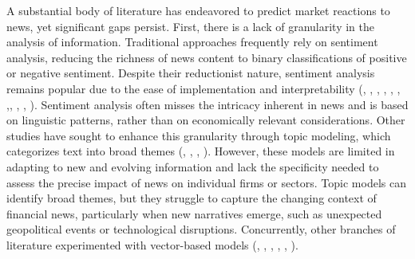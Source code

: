 A substantial body of literature has endeavored to predict market reactions to news, yet significant gaps persist. 
First, there is a lack of granularity in the analysis of information. Traditional approaches frequently rely on sentiment analysis, reducing the richness of news content to binary classifications of positive or negative sentiment. Despite their reductionist nature, sentiment analysis remains popular due to the ease of implementation and interpretability
(\cite{tetlock2007giving}, \cite{tetlock2008more}, \cite{bollen2011twitter}, \cite{hanley2010information}, \cite{loughran2011liability}, \cite{garcia2013sentiment}, \cite{jegadeesh2013word},\cite{wei2018stock}, \cite{ke2019predicting}, \cite{lee2020bert}, 
\cite{lopez2023can}).
Sentiment analysis often misses the intricacy inherent in news and is based on linguistic patterns, rather than on economically relevant considerations.
 Other studies have sought to enhance this granularity through topic modeling, which categorizes text into broad themes 
(\cite{antweiler2006us}, \cite{hansen2018transparency}, \cite{bybee2021business}, \cite{bybee2023narrative}).
However, these models are limited in adapting to new and evolving information and lack the specificity needed to assess the precise impact of news on individual firms or sectors. Topic models can identify broad themes, but they struggle to capture the changing context of financial news, particularly when new narratives emerge, such as unexpected geopolitical events or technological disruptions. 
Concurrently, other branches of literature experimented with vector-based models 
(\cite{hoberg2016text}, \cite{chen2021stock}, \cite{jha2022does}, \cite{benincasa2022different}, \cite{zhang2023feel}, \cite{gabaix2023asset}).
